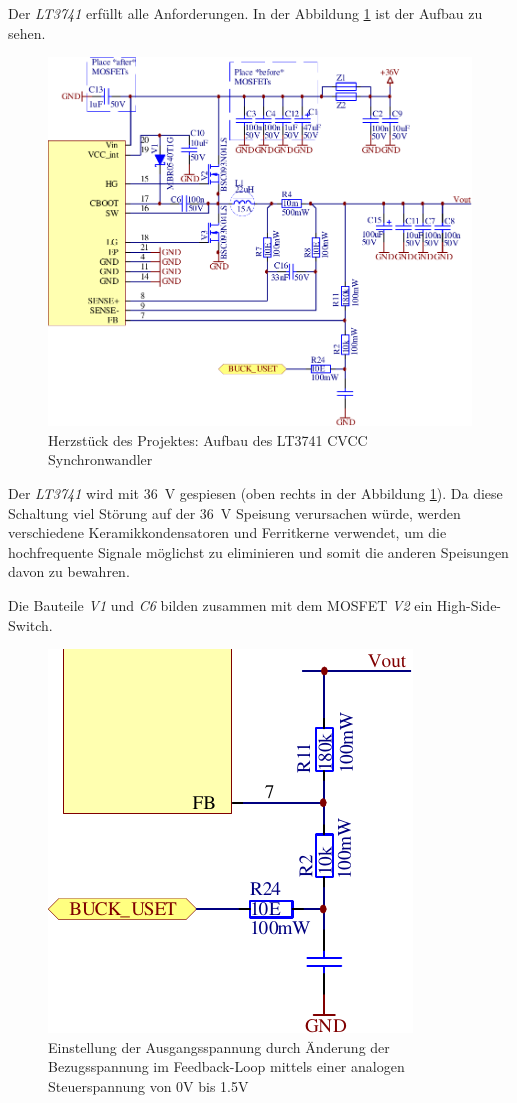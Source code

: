 Der   \emph{LT3741}    erf\"ullt    alle   Anforderungen.   In   der   Abbildung
\ref{fig:circuit:buck} ist der Aufbau zu sehen.

\begin{figure}[th!]
    \center
    \includegraphics[width=.75\textwidth]{images/circuit/buck.pdf}
    \caption{Herzst\"uck des Projektes: Aufbau des LT3741 CVCC Synchronwandler}
    \label{fig:circuit:buck}
\end{figure}

Der  \emph{LT3741}  wird  mit  \SI{36}{\volt}  gespiesen  (oben  rechts  in  der
Abbildung \ref{fig:circuit:buck}). Da diese Schaltung  viel  St\"orung  auf  der
\SI{36}{\volt}     Speisung    verursachen    w\"urde,    werden    verschiedene
Keramikkondensatoren  und Ferritkerne verwendet, um  die  hochfrequente  Signale
m\"oglichst zu eliminieren und somit die  anderen  Speisungen davon zu bewahren.

Die Bauteile \emph{V1}  und  \emph{C6}  bilden zusammen mit dem MOSFET \emph{V2}
ein High-Side-Switch.

\begin{figure}[H]
    \center
    \includegraphics[width=.35\textwidth]{images/circuit/buck-uset.pdf}
    \caption{Einstellung der Ausgangsspannung durch \"Anderung der Bezugsspannung im Feedback-Loop mittels einer analogen Steuerspannung von 0V bis 1.5V}
    \label{fig:circuit:buck:uset}
\end{figure}

